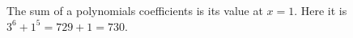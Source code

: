 The sum of a polynomial\textquotesingle s coefficients is its value at $x=1$. Here it is $3^6+1^5=729+1=\boxed{730}$.
